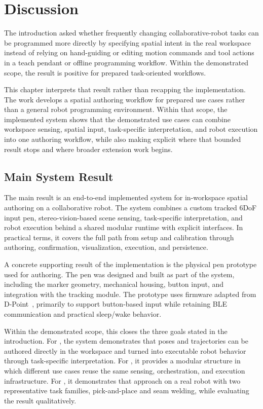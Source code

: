 \chapter{Discussion} \label{chapter:ch6_discussion}

The introduction asked whether frequently changing collaborative-robot tasks can be programmed more directly by specifying spatial intent in the real workspace instead of relying on hand-guiding or editing motion commands and tool actions in a teach pendant or offline programming workflow. Within the demonstrated scope, the result is positive for prepared task-oriented workflows.

This chapter interprets that result rather than recapping the implementation. The work develops a spatial authoring workflow for prepared use cases rather than a general robot programming environment. Within that scope, the implemented system shows that the demonstrated use cases can combine workspace sensing, spatial input, task-specific interpretation, and robot execution into one authoring workflow, while also making explicit where that bounded result stops and where broader extension work begins.

\section{Main System Result}

The main result is an end-to-end implemented system for in-workspace spatial authoring on a collaborative robot. The system combines a custom tracked 6DoF input pen, stereo-vision-based scene sensing, task-specific interpretation, and robot execution behind a shared modular runtime with explicit interfaces. In practical terms, it covers the full path from setup and calibration through authoring, confirmation, visualization, execution, and persistence.

A concrete supporting result of the implementation is the physical pen prototype used for authoring. The pen was designed and built as part of the system, including the marker geometry, mechanical housing, button input, and integration with the tracking module. The prototype uses firmware adapted from D-Point~\cite{dpoint_github}, primarily to support button-based input while retaining BLE communication and practical sleep/wake behavior.

Within the demonstrated scope, this closes the three goals stated in the introduction. For , the system demonstrates that poses and trajectories can be authored directly in the workspace and turned into executable robot behavior through task-specific interpretation. For , it provides a modular structure in which different use cases reuse the same sensing, orchestration, and execution infrastructure. For , it demonstrates that approach on a real robot with two representative task families, pick-and-place and seam welding, while evaluating the result qualitatively.

